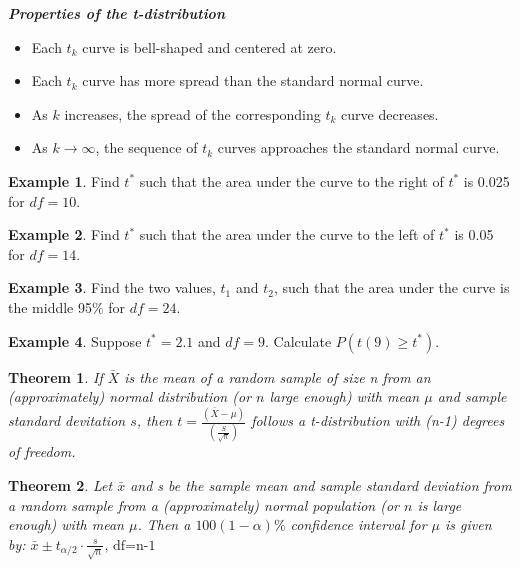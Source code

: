 \documentclass[
  11pt,
  oneside]{book}
\providecommand{\tightlist}{%
  \setlength{\itemsep}{0pt}\setlength{\parskip}{0pt}}
\newtheorem{theorem}{Theorem}[chapter]
\theoremstyle{definition}
\theoremstyle{definition}
\newtheorem{example}{Example}[chapter]
\theoremstyle{definition}
\theoremstyle{definition}
\theoremstyle{remark}
\begin{document}
\textbf{\emph{Properties of the t-distribution}}

\begin{itemize}
\tightlist
\item
  Each \(t_{k}\) curve is bell-shaped and centered at zero.
\item
  Each \(t_{k}\) curve has more spread than the standard normal curve.
\item
  As \(k\) increases, the spread of the corresponding \(t_{k}\) curve decreases.
\item
  As \(k \to \infty\), the sequence of \(t_{k}\) curves approaches the standard normal curve.
\end{itemize}

\begin{example}
Find \(t^*\) such that the area under the curve to the right of \(t^*\) is 0.025 for \(df=10\).
\end{example}

\vfill

\begin{example}
Find \(t^*\) such that the area under the curve to the left of \(t^*\) is 0.05 for \(df=14\).
\end{example}

\vfill

\begin{example}
Find the two values, \(t_1\) and \(t_2\), such that the area under the curve is the middle 95\% for \(df=24\).
\end{example}

\vfill

\begin{example}
Suppose \(t^*=2.1\) and \(df=9\). Calculate \(P(t(9) \geq t^*)\).
\end{example}

\vfill

\newpage

\begin{theorem}
If \(\bar{X}\) is the mean of a random sample of size n from an (approximately) normal distribution (or \(n\) large enough) with mean \(\mu\) and sample standard devitation \(s\), then \(t = \frac{(\bar{X}-\mu)}{(\frac{S}{\sqrt{n}})}\) follows a t-distribution with (n-1) degrees of freedom.
\end{theorem}

\begin{theorem}
Let \(\bar{x}\) and s be the sample mean and sample standard deviation from a random sample from a (approximately) normal population (or \(n\) is large enough) with mean \(\mu\). Then a \(100(1-\alpha)\%\) confidence interval for \(\mu\) is given by:
\({\bar{x} \pm t_{\alpha/2} \cdot \frac{s}{\sqrt{n}}\text{, df=n-1}}\)
\end{theorem}
\end{document}
